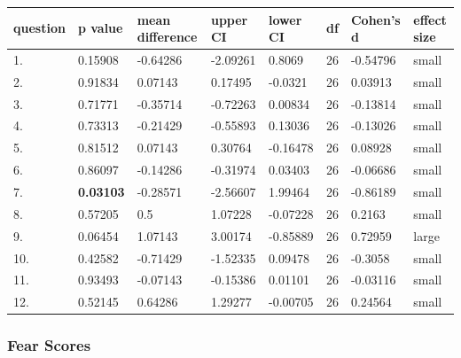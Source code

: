 \documentclass[11pt, twoside, reqno]{book}
\begin{document}
\begin{tabular}{|l|l|l|l|l|l|l|l|}
\hline
    question & p value & mean difference & upper CI & lower CI & df & Cohen's d & effect size  \\ \hline
    1. & 0.15908 & -0.64286 & -2.09261 & 0.8069 & 26 & -0.54796 & small \\ \hline
    2. & 0.91834 & 0.07143 & 0.17495 & -0.0321 & 26 & 0.03913 & small  \\ \hline
    3. & 0.71771 & -0.35714 & -0.72263 & 0.00834 & 26 & -0.13814 & small  \\ \hline
    4. & 0.73313 & -0.21429 & -0.55893 & 0.13036 & 26 & -0.13026 & small \\ \hline
    5. & 0.81512 & 0.07143 & 0.30764 & -0.16478 & 26 & 0.08928 & small  \\ \hline
    6. & 0.86097 & -0.14286 & -0.31974 & 0.03403 & 26 & -0.06686 & small \\ \hline
    7. & \textbf{0.03103} & -0.28571 & -2.56607 & 1.99464 & 26 & -0.86189 & small \\ \hline
    8. & 0.57205 & 0.5 & 1.07228 & -0.07228 & 26 & 0.2163 & small \\ \hline
    9. & 0.06454 & 1.07143 & 3.00174 & -0.85889 & 26 & 0.72959 & large \\ \hline
    10. & 0.42582 & -0.71429 & -1.52335 & 0.09478 & 26 & -0.3058 & small  \\ \hline
    11. & 0.93493 & -0.07143 & -0.15386 & 0.01101 & 26 & -0.03116 & small \\ \hline
    12. & 0.52145 & 0.64286 & 1.29277 & -0.00705 & 26 & 0.24564 & small \\ \hline
\end{tabular}
\vspace{16pt}

\subsubsection{\textbf{Fear Scores}}
\end{document}
